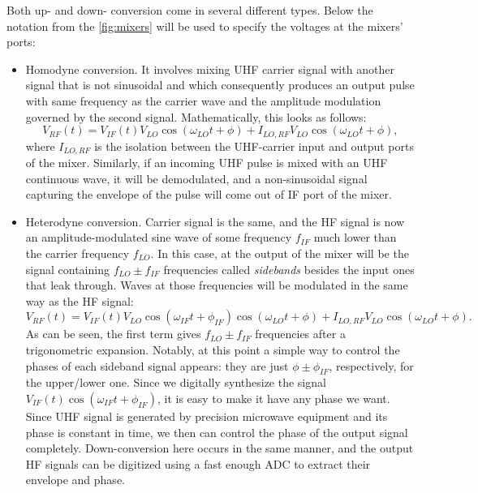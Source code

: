 Both up- and down- conversion come in several different types. Below the notation from the \autoref{fig:mixers} will be used to specify the voltages at the mixers' ports:
\begin{itemize}[topsep=5pt, itemsep=5pt]
\item Homodyne conversion. It involves mixing UHF carrier signal with another signal that is not sinusoidal and which consequently produces an output pulse with same frequency as the carrier wave and the amplitude modulation governed by the second signal. Mathematically, this looks as follows:
\[
V_{RF}(t) = V_{IF}(t) V_{LO} \cos(\omega_{LO} t + \phi) + I_{LO, RF}V_{LO} \cos(\omega_{LO} t + \phi),
\]
where $I_{LO, RF}$ is the isolation between the UHF-carrier input and output ports of the mixer. Similarly, if an incoming UHF pulse is mixed with an UHF continuous wave, it will be demodulated, and a non-sinusoidal signal capturing the envelope of the pulse will come out of IF port of the mixer. 

\item Heterodyne conversion. Carrier signal is the same, and the HF signal is now an amplitude-modulated sine wave of some frequency $f_{IF}$ much lower than the carrier frequency $f_{LO}$. In this case, at the output of the mixer will be the signal containing $f_{LO} \pm f_{IF}$ frequencies called \textit{sidebands} besides the input ones that leak through. Waves at those frequencies will be modulated in the same way as the HF signal:
\[
V_{RF}(t) = V_{IF}(t) V_{LO}\cos(\omega_{IF}t+\phi_{IF}) \cos(\omega_{LO} t + \phi) + I_{LO, RF} V_{LO} \cos(\omega_{LO} t + \phi).
\]
As can be seen, the first term gives $f_{LO} \pm f_{IF}$ frequencies after a trigonometric expansion. Notably, at this point a simple way to control the phases of each sideband signal appears: they are just $\phi\pm\phi_{IF}$, respectively, for the upper/lower one. Since we digitally synthesize the signal $V_{IF}(t)\cos(\omega_{IF}t+\phi_{IF})$, it is easy to make it have any phase we want. Since UHF signal is generated by precision microwave equipment and its phase is constant in time, we then can control the phase of the output signal completely. Down-conversion here occurs in the same manner, and the output HF signals can be digitized using a fast enough ADC to extract their envelope and phase. 


\end{itemize}
